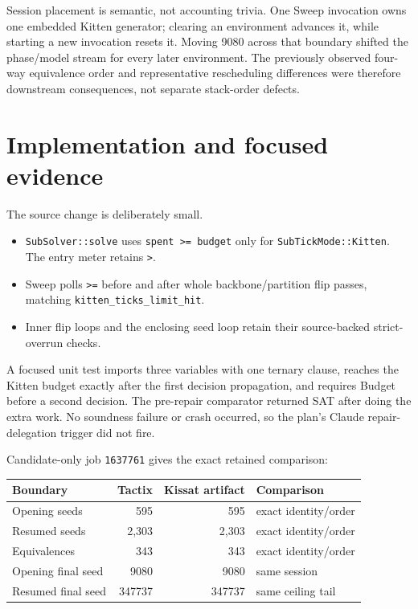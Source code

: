 \documentclass[11pt]{article}
\newcommand{\code}[1]{\texttt{#1}}
\begin{document}
Session placement is semantic, not accounting trivia.  One Sweep invocation
owns one embedded Kitten generator; clearing an environment advances it, while
starting a new invocation resets it.  Moving 9080 across that boundary shifted
the phase/model stream for every later environment.  The previously observed
four-way equivalence order and representative rescheduling differences were
therefore downstream consequences, not separate stack-order defects.

\section*{Implementation and focused evidence}
The source change is deliberately small.

\begin{itemize}
\item \code{SubSolver::solve} uses \code{spent >= budget} only for
  \code{SubTickMode::Kitten}.  The entry meter retains \code{>}.
\item Sweep polls \code{>=} before and after whole backbone/partition flip
  passes, matching \code{kitten\_ticks\_limit\_hit}.
\item Inner flip loops and the enclosing seed loop retain their source-backed
  strict-overrun checks.
\end{itemize}

A focused unit test imports three variables with one ternary clause, reaches
the Kitten budget exactly after the first decision propagation, and requires
Budget before a second decision.  The pre-repair comparator returned SAT after
doing the extra work.  No soundness failure or crash occurred, so the plan's
Claude repair-delegation trigger did not fire.

Candidate-only job \code{1637761} gives the exact retained comparison:

\begin{center}
\begin{tabular}{lrrl}
\toprule
Boundary & Tactix & Kissat artifact & Comparison \\
\midrule
Opening seeds & 595 & 595 & exact identity/order \\
Resumed seeds & 2,303 & 2,303 & exact identity/order \\
Equivalences & 343 & 343 & exact identity/order \\
Opening final seed & 9080 & 9080 & same session \\
Resumed final seed & 347737 & 347737 & same ceiling tail \\
\bottomrule
\end{tabular}
\end{center}
\end{document}
